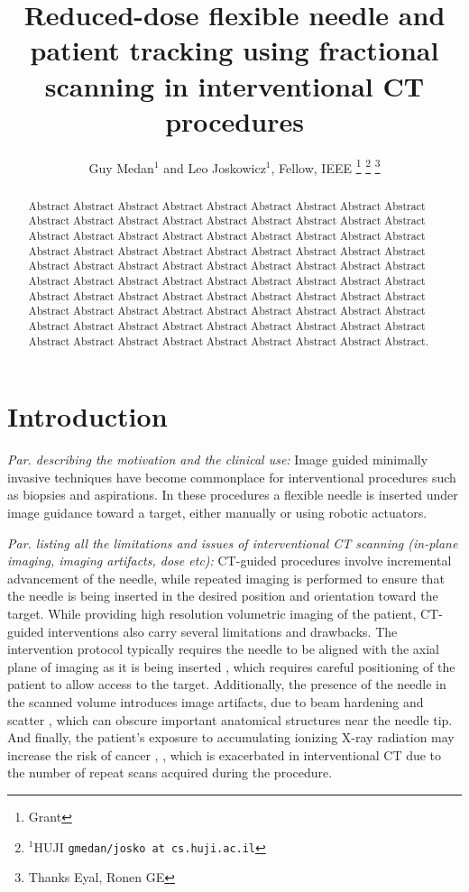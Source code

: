 \documentclass[letterpaper, 11 pt, conference]{ieeeconf}  %
\title{\LARGE \bf
Reduced-dose flexible needle and patient tracking using fractional scanning in interventional CT procedures 
}
\author{Guy Medan$^{1}$ and Leo Joskowicz$^{1}$, Fellow, IEEE%
\thanks{Grant}%
\thanks{$^{1}$HUJI
        {\tt\small gmedan/josko at cs.huji.ac.il}}%
\thanks{Thanks Eyal, Ronen GE}%
}
\begin{document}
\maketitle
\thispagestyle{empty}
\pagestyle{empty}


\begin{abstract}
Abstract Abstract Abstract Abstract Abstract Abstract
Abstract Abstract Abstract Abstract Abstract Abstract
Abstract Abstract Abstract Abstract Abstract Abstract
Abstract Abstract Abstract Abstract Abstract Abstract
Abstract Abstract Abstract Abstract Abstract Abstract
Abstract Abstract Abstract Abstract Abstract Abstract
Abstract Abstract Abstract Abstract Abstract Abstract
Abstract Abstract Abstract Abstract Abstract Abstract
Abstract Abstract Abstract Abstract Abstract Abstract
Abstract Abstract Abstract Abstract Abstract Abstract
Abstract Abstract Abstract Abstract Abstract Abstract
Abstract Abstract Abstract Abstract Abstract Abstract
Abstract Abstract Abstract Abstract Abstract Abstract
Abstract Abstract Abstract Abstract Abstract Abstract
Abstract Abstract Abstract Abstract Abstract Abstract.

\end{abstract}

\section{Introduction}

\textit{Par. describing the motivation and the clinical use:}
Image guided minimally invasive techniques have become commonplace for interventional procedures such as biopsies and aspirations.
In these procedures a flexible needle is inserted under image guidance toward a target, either manually or using robotic actuators.

\textit{Par. listing all the limitations and issues of interventional CT scanning (in-plane imaging, imaging artifacts, dose etc):}
CT-guided procedures involve incremental advancement of the needle, while repeated imaging is performed to ensure that the needle is being inserted in the desired position and orientation toward the target.
While providing high resolution volumetric imaging of the patient, CT-guided interventions also carry several limitations and drawbacks.
The intervention protocol typically requires the needle to be aligned with the axial plane of imaging as it is being inserted \cite{gupta2014ct}, which requires careful positioning of the patient to allow access to the target.
Additionally, the presence of the needle in the scanned volume introduces image artifacts, due to beam hardening and scatter \cite{boas2012ctartifacts}, which can obscure important anatomical structures near the needle tip.
And finally, the patient's exposure to accumulating ionizing X-ray radiation may increase the risk of cancer \cite{mettler2000ct}, \cite{chodick2007excess}, which is exacerbated in interventional CT due to the number of repeat scans acquired during the procedure.
\end{document}
